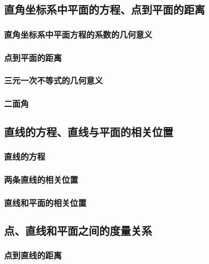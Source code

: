 \subsection{直角坐标系中平面的方程、点到平面的距离}

\subsubsection{直角坐标系中平面方程的系数的几何意义}

\subsubsection{点到平面的距离}

\subsubsection{三元一次不等式的几何意义}

\subsubsection{二面角}

\subsection{直线的方程、直线与平面的相关位置}

\subsubsection{直线的方程}

\subsubsection{两条直线的相关位置}

\subsubsection{直线和平面的相关位置}

\subsection{点、直线和平面之间的度量关系}

\subsubsection{点到直线的距离}

